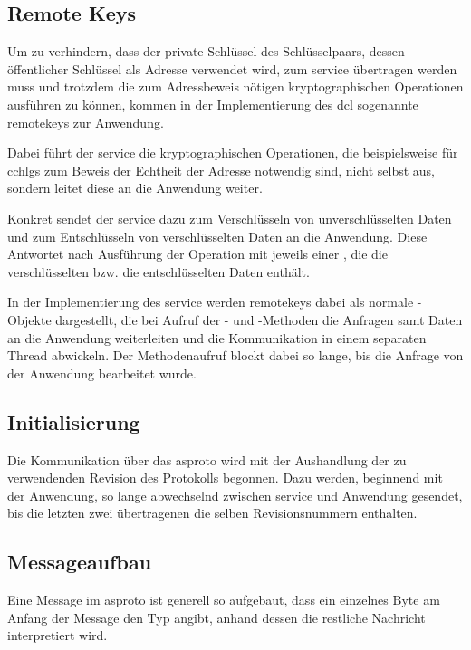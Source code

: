 \subsection{Remote Keys}
\label{dcl-asproto-remotekeys}
Um zu verhindern, dass der private Schlüssel des Schlüsselpaars, dessen
öffentlicher Schlüssel als Adresse verwendet wird, zum \gls{service} übertragen
werden muss und trotzdem die zum Adressbeweis nötigen kryptographischen
Operationen ausführen zu können, kommen in der Implementierung des \gls{dcl}
sogenannte \glspl{remotekey} zur Anwendung.

Dabei führt der \gls{service} die kryptographischen Operationen, die
beispielsweise für \glspl{cchlg} zum Beweis der Echtheit der Adresse notwendig
sind, nicht selbst aus, sondern leitet diese an die Anwendung weiter.

Konkret sendet der \gls{service} dazu \msgpl{\asprotokeyenc} zum Verschlüsseln
von unverschlüsselten Daten und \msgpl{\asprotokeydec} zum Entschlüsseln von
verschlüsselten Daten an die Anwendung. Diese Antwortet nach Ausführung der
Operation mit jeweils einer \msg{\asprotocryptoresponse}, die die
verschlüsselten bzw. die entschlüsselten Daten enthält.

In der Implementierung des \gls{service} werden \glspl{remotekey} dabei als
normale -Objekte dargestellt, die bei Aufruf der - und
-Methoden die Anfragen samt Daten an die Anwendung weiterleiten
und die Kommunikation in einem separaten Thread abwickeln.
Der Methodenaufruf blockt dabei so lange, bis die Anfrage von der Anwendung
bearbeitet wurde.

\subsection{Initialisierung}
Die Kommunikation über das \gls{asproto} wird mit der Aushandlung der zu
verwendenden Revision des Protokolls begonnen.
Dazu werden, beginnend mit der Anwendung, so lange \msgpl{\asprotorevision}
abwechselnd zwischen \gls{service} und Anwendung gesendet, bis die letzten
zwei übertragenen \msgpl{\asprotorevision} die selben Revisionsnummern
enthalten.

\subsection{Messageaufbau}
Eine Message im \gls{asproto} ist generell so aufgebaut, dass ein einzelnes Byte
am Anfang der Message den Typ angibt, anhand dessen die restliche Nachricht
interpretiert wird.

